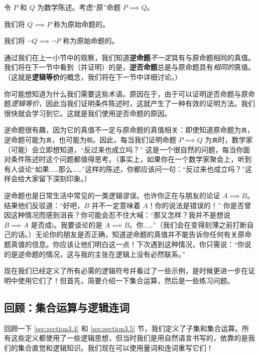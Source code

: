\begin{definition}
    令 $P$ 和 $Q$ 为数学陈述。考虑``原''命题 $P \implies Q$。

    我们将 $Q \implies P$ 称为原始命题的。

    我们将 $\neg Q \implies \neg P$ 称为原始命题的。
\end{definition}

通过我们在上一小节中的观察，我们知道\textbf{逆命题}\emph{不一定}具有与原命题相同的真值。我们将在下一节中看到（并证明）的是，\textbf{逆否命题}总是与原命题具有\emph{相同的}真值。（这就是\textbf{逻辑等价}的概念，我们将在下一节中详细讨论。）

你可能想知道为什么我们需要这些术语。原因在于，由于可以证明逆否命题与原命题\emph{逻辑等价}，因此当我们证明条件陈述时，这就产生了一种有效的证明方法。我们很快就会学习到它。这就是我们使用逆否命题的原因。

逆命题很有趣，因为它的真值不一定与原命题的真值相关：即使知道原命题为\verb|真|，逆命题可能为\verb|真|，也可能为\verb|假|。因此，每当我们证明命题 $P \implies Q$ 为\verb|真|时，数学家（可能）会立即想知道，``反过来也成立吗？'' 这是一个很自然的问题，每当你面对条件陈述时这个问题都值得思考。（事实上，如果你在一个数学家聚会上，听到有人谈论``如果……那么……''这样的陈述，你都应该问一句：``反过来也成立吗？''这样会给大家留下深刻印象。）

逆命题也是日常生活中常见的一类逻辑谬误。也许你正在与朋友的论证 $A \implies B$。结果他们反驳道：``好吧，$B$ 并不一定意味着 $A$！你的说法是错误的！'' 你是否曾因这种情况而感到沮丧？你可能会忍不住大喊：``那又怎样？我并不是想说 $B \implies A$ 是否成i。我要谈论的是 $A \implies B$。你……''（我们会在变得刻薄之前打断自己的话。）无论你的朋友是否正确，知道逆命题的真值并不能告诉你任何有关原命题真值的信息。你应该让他们明白这一点！下次遇到这种情况，你只需说：``你说的是逆命题的情况，这与我的主张在逻辑上没有必然联系。''

现在我们已经定义了所有必需的逻辑符号并看过了一些示例，是时候更进一步在证明中使用它们了！但首先，简要介绍一下集合运算，然后是一些练习问题。

\subsection{回顾：集合运算与逻辑连词}\label{sec:section4.5.4}

回顾一下 \ref{sec:section3.4} 和 \ref{sec:section3.5} 节，我们定义了子集和集合运算。所有这些定义都使用了一些逻辑思想，但当时我们是用自然语言书写的，依靠的是我们的集合直觉和逻辑知识。我们现在可以使用量词和连词重写它们！

